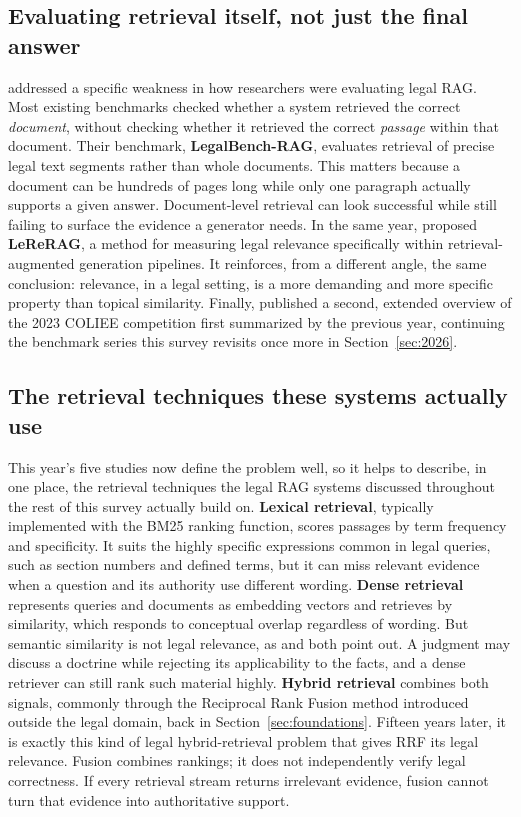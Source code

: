 \subsection{Evaluating retrieval itself, not just the final answer}

\citet{pipitone2024} addressed a specific weakness in how researchers were evaluating legal RAG.
Most existing benchmarks checked whether a system retrieved the correct \emph{document}, without
checking whether it retrieved the correct \emph{passage} within that document. Their benchmark,
\textbf{LegalBench-RAG}, evaluates retrieval of precise legal text segments rather than whole
documents. This matters because a document can be hundreds of pages long while only one paragraph
actually supports a given answer. Document-level retrieval can look successful while still failing
to surface the evidence a generator needs. In the same year, \citet{wiggers2024} proposed
\textbf{LeReRAG}, a method for measuring legal relevance specifically within retrieval-augmented
generation pipelines. It reinforces, from a different angle, the same conclusion: relevance, in a
legal setting, is a more demanding and more specific property than topical similarity. Finally,
\citet{goebel2024} published a second, extended overview of the 2023 COLIEE competition first
summarized by \citet{goebel2023} the previous year, continuing the benchmark series this survey
revisits once more in Section~\ref{sec:2026}.

\subsection{The retrieval techniques these systems actually use}

This year's five studies now define the problem well, so it helps to describe, in one place, the
retrieval techniques the legal RAG systems discussed throughout the rest of this survey actually
build on. \textbf{Lexical retrieval}, typically implemented with the BM25 ranking function, scores
passages by term frequency and specificity. It suits the highly specific expressions common in
legal queries, such as section numbers and defined terms, but it can miss relevant evidence when a
question and its authority use different wording. \textbf{Dense retrieval} represents queries and
documents as embedding vectors and retrieves by similarity, which responds to conceptual overlap
regardless of wording. But semantic similarity is not legal relevance, as \citet{feng2024} and
\citet{wiggers2024} both point out. A judgment may discuss a doctrine while rejecting its
applicability to the facts, and a dense retriever can still rank such material highly.
\textbf{Hybrid retrieval} combines both signals, commonly through the Reciprocal Rank Fusion method
\citet{cormack2009} introduced outside the legal domain, back in Section~\ref{sec:foundations}.
Fifteen years later, it is exactly this kind of legal hybrid-retrieval problem that gives RRF its
legal relevance. Fusion combines rankings; it does not independently verify legal correctness. If
every retrieval stream returns irrelevant evidence, fusion cannot turn that evidence into
authoritative support.

